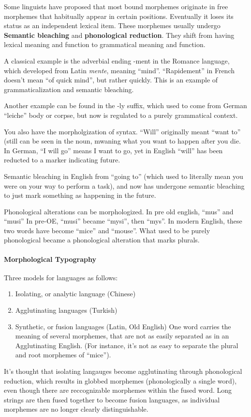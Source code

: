 \documentclass{exam}
\begin{document}
Some linguists have proposed that most bound morphemes originate in free morphemes that habitually appear in certain positions. 
Eventually it loses its status as an independent lexical item. 
These morphemes usually undergo \textbf{Semantic bleaching} and \textbf{phonological reduction}. 
They shift from having lexical meaning and function to grammatical meaning and function. 

A classical example is the adverbial ending -ment in the Romance language, which developed from Latin \textit{mente}, meaning ``mind''. ``Rapidement'' in French doesn't mean ``of quick mind'', but rather quickly. This is an example of grammaticalization and semantic bleaching. 

\noindent Another example can be found in the -ly suffix, which used to come from German ``leiche'' body or corpse, but now is regulated to a purely grammatical context. 

You also have the morpholgization of syntax. ``Will'' originally meant ``want to'' (still can be seen in the noun, mwaning what you want to happen after you die. 
In German, ``I will go'' means I want to go, yet in English ``will'' has been reducted to a marker indicating future. 

Semantic bleaching in English from ``going to'' (which used to literally mean you were on your way to perform a task), and now has undergone semantic bleaching to just mark something as happening in the future. 

Phonological alterations can be morphologized. In pre old english, ``mus'' and ``musi'' 
In pre-OE, ``musi'' became ``mysi'', then ``mys''. 
In modern English, these two words have become ``mice'' and ``mouse''.
What used to be purely phonological became a phonological alteration that marks plurals.


\paragraph{Morphological Typography}

    Three models for languages as follows: 
\begin{enumerate}
    \item Isolating, or analytic language (Chinese)

    \item Agglutinating languages (Turkish)

    \item Synthetic, or fusion languages (Latin, Old English) One word carries the meaning of several morphemes, that are not as easily separated as in an Agglutinating English. 
(For instance, it's not as easy to separate the plural and root morphemes of ``mice''). 

\end{enumerate}
It's thought that isolating langauges become agglutinating through phonological reduction, which results in globbed morphemes (phonologically a single word), even though there are reccognizable morphemes within the fused word. 
Long strings are then fused together to become fusion languages, as individual morphemes are no longer clearly distinguishable. 
\end{document}
